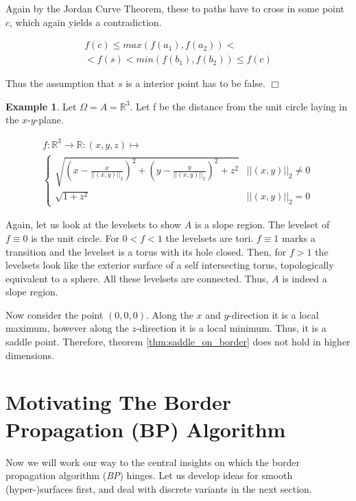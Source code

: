 \documentclass[11pt,twoside,twocolumn,a4paper]{article}
\theoremstyle{plain}
\theoremstyle{definition}
\newtheorem{exmp}[thm]{Example} %
\begin{document}
Again by the Jordan Curve Theorem, these to paths have to cross in some point $c$, which again yields a contradiction.

\begin{multline*}
f(c) \leq max(f(a_1), f(a_2)) < \\
< f(s) < min(f(b_1), f(b_2)) \leq f(c)
\end{multline*}

Thus the assumption that $s$ is a interior point has to be false.
\hfill $\Box$

\begin{exmp}
Let $\Omega = A = \mathbb R^3$.
Let f be the distance from the unit circle laying in the $x$-$y$-plane. 

\begin{multline*}
f: \mathbb R^3 \to \mathbb R: (x,y,z) \mapsto \\
\begin{cases}
\sqrt{\left(x - \frac{x}{||\left(x,y\right)||_2}\right)^2 + \left(y - \frac{y}{||\left(x,y\right)||_2}\right)^2 + z^2} & ||(x,y)||_2 \neq 0 \\
\sqrt{1+z^2} & ||(x,y)||_2 = 0
\end{cases}
\end{multline*}

Again, let us look at the levelsets to show $A$ is a slope region.
The levelset of $f \equiv 0$ is the unit circle. For $0 < f < 1$ the levelsets are tori.
$f \equiv 1$ marks a transition and the levelset is a torus with its hole closed.
Then, for $f > 1$ the levelsets look like the exterior surface of a self intersecting torus, topologically equivalent to a sphere.
All these levelsets are connected.
Thus, $A$ is indeed a slope region.

Now consider the point $(0,0,0)$.
Along the $x$ and $y$-direction it is a local maximum, however along the $z$-direction it is a local minimum.
Thus, it is a saddle point.
Therefore, theorem \ref{thm:saddle_on_border} does not hold in higher dimensions.
\end{exmp}


\section{Motivating The Border Propagation (BP) Algorithm}
\label{sec:motivating_BP}

Now we will work our way to the central insights on which the border propagation algorithm (\emph{BP}) hinges.
Let us develop ideas for smooth (hyper-)surfaces first, and deal with discrete variants in the next section.
\end{document}
